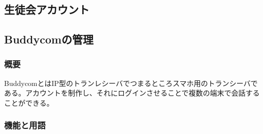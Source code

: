 \documentclass[dvipdfmx,jb5]{jarticle}
\begin{document}
\subsection{生徒会アカウント}

\subsection{Buddycomの管理}
\subsubsection{概要}
BuddycomとはIP型のトランレシーバでつまるところスマホ用のトランシーバである。アカウントを制作し、それにログインさせることで複数の端末で会話することができる。
\subsubsection{機能と用語}
\end{document}

